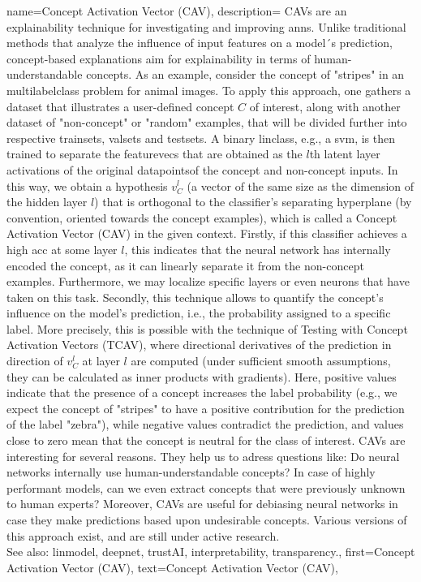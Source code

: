 {name={Concept Activation Vector (CAV)},
	description={ 
CAVs \cite{kim2018interpretability} are an \gls{explainability} technique for investigating and improving \glspl{ann}. Unlike traditional methods that analyze the influence of input \glspl{feature} on a \gls{model}´s \gls{prediction}, concept-based \glspl{explanation} aim for \gls{explainability} in terms of human-understandable concepts. As an example, consider the concept of "stripes" in an \gls{multilabelclass} problem for animal images.
To apply this approach, one gathers a \gls{dataset} that illustrates a user-defined concept $C$ of interest, along with another \gls{dataset} of "non-concept" or "random" examples, that will be divided further into respective \glspl{trainset}, \glspl{valset}
and \glspl{testset}. A binary \gls{linclass}, e.g., a \gls{svm}, is then trained 
 to separate the \glspl{featurevec} that are obtained as the $l$th latent layer activations of the original \glspl{datapoint}of the concept and non-concept inputs. In this way, we obtain a \gls{hypothesis} $v_C^l$ (a \gls{vector} of the same size as the dimension of the hidden layer $l$) that is orthogonal to the \gls{classifier}'s separating hyperplane (by convention, oriented towards the concept examples), which is called a Concept Activation Vector (CAV) in the given context.
 Firstly, if this \gls{classifier} achieves a high \gls{acc} at some layer $l$, this indicates that the neural network has internally encoded the concept, as it can linearly separate it from the non-concept examples. Furthermore, we may localize specific layers or even neurons that have taken on this task.
 Secondly, this technique allows to quantify the concept's influence on the \gls{model}'s \gls{prediction}, i.e., the \gls{probability} assigned to a specific \gls{label}. More precisely, this is possible with the technique of
Testing with Concept Activation Vectors (TCAV), where directional derivatives of the \gls{prediction} in direction of $v_C^l$ at layer $l$ are computed 
 (under sufficient \gls{smooth} assumptions, they can be calculated as inner products with \gls{gradient}s). Here, positive values indicate that the presence of a concept increases the \gls{label} \gls{probability} (e.g., we expect the concept of "stripes" to have a positive contribution for the prediction of the \gls{label} "zebra"), while negative values contradict the prediction, and values close to zero mean that the concept is neutral for the class of interest.
 CAVs are interesting for several reasons. They help us to adress questions like: Do neural networks internally use human-understandable concepts? In case of highly performant \glspl{model}, can we even extract concepts that were previously unknown to human experts? Moreover, CAVs are useful for debiasing neural networks in case they make predictions based upon undesirable concepts. Various versions of this approach exist, and are still under active research.
				\\
		 See also: \gls{linmodel},  \gls{deepnet},  \gls{trustAI}, \gls{interpretability}, \gls{transparency}.}, 
	first={Concept Activation Vector (CAV)},
	text={Concept Activation Vector (CAV)}, 
}


